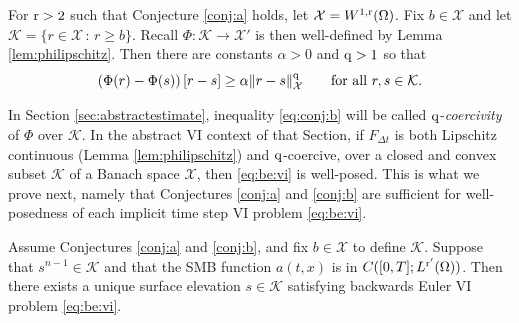 \documentclass[hidelinks,onefignum,onetabnum,final]{siamart220329}  %
\newcommand{\cK}{\mathcal{K}}
\newcommand{\cX}{\mathcal{X}}
\newcommand{\qq}{{\text{\textnormal{q}}}}
\newcommand{\rr}{{\text{\textnormal{r}}}}
\begin{document}
\begin{conjecture} \label{conj:b}  For $\rr>2$ such that Conjecture \ref{conj:a} holds, let $\cX = W^{1,\rr}(\Omega)$.  Fix $b\in\cX$ and let $\cK=\{r\in\cX\,:\,r\ge b\}$.  Recall $\Phi:\cK\to\cX'$ is then well-defined by Lemma \ref{lem:philipschitz}.  Then there are constants $\alpha>0$ and $\qq>1$ so that
\begin{equation}
\left(\Phi(r) - \Phi(s)\right)[r-s] \ge \alpha \|r-s\|_{\cX}^\qq \qquad \text{for all } r,s\in\cK. \label{eq:conj:b}
\end{equation}
\end{conjecture}

In Section \ref{sec:abstractestimate}, inequality \eqref{eq:conj:b} will be called $\qq$-\emph{coercivity} of $\Phi$ over $\cK$.  In the abstract VI context of that Section, if $F_{\Delta t}$ is both Lipschitz continuous (Lemma \ref{lem:philipschitz}) and $\qq$-coercive, over a closed and convex subset $\cK$ of a Banach space $\cX$, then \eqref{eq:be:vi} is well-posed.  This is what we prove next, namely that Conjectures \ref{conj:a} and \ref{conj:b} are sufficient for well-posedness of each implicit time step VI problem \eqref{eq:be:vi}.

\begin{theorem} \label{thm:stepwellposed}  Assume Conjectures \ref{conj:a} and \ref{conj:b}, and fix $b \in \cX$ to define $\cK$.  Suppose that $s^{n-1}\in\cK$ and that the SMB function $a(t,x)$ is in $C([0,T]; L^{\rr'}(\Omega))$.  Then there exists a unique surface elevation $s\in\cK$ satisfying backwards Euler VI problem \eqref{eq:be:vi}. \end{theorem}
\end{document}
